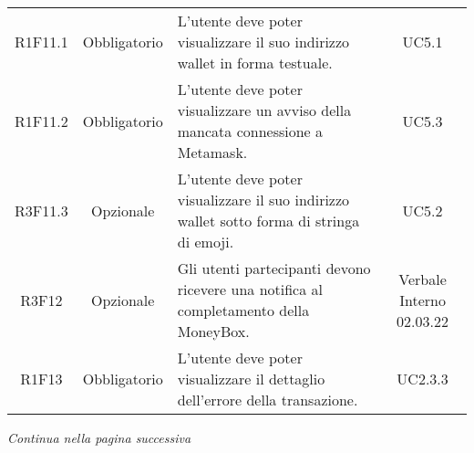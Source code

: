 \begin{table}[H]
\begin{tabular}{c | c | p{6cm} | c}
        R1F11.1                                                           & Obbligatorio & L'utente deve poter visualizzare il suo indirizzo wallet\glo{} in forma testuale.                                & UC5.1                    \\
        R1F11.2                                                           & Obbligatorio & L'utente deve poter visualizzare un avviso della mancata connessione a Metamask\glo{}.                     & UC5.3                    \\
        R3F11.3                                                           & Opzionale    & L'utente deve poter visualizzare il suo indirizzo wallet\glo{} sotto forma di stringa di emoji.                  & UC5.2                    \\
        R3F12                                                             & Opzionale    & Gli utenti partecipanti devono ricevere una notifica al completamento della MoneyBox\glo{}.                & Verbale Interno 02.03.22 \\
        R1F13                                                             & Obbligatorio & L'utente deve poter visualizzare il dettaglio dell'errore della transazione.                               & UC2.3.3                  \\
    \end{tabular}
\end{table}
\begin{center}
    \textit{\small Continua nella pagina successiva}
\end{center}
